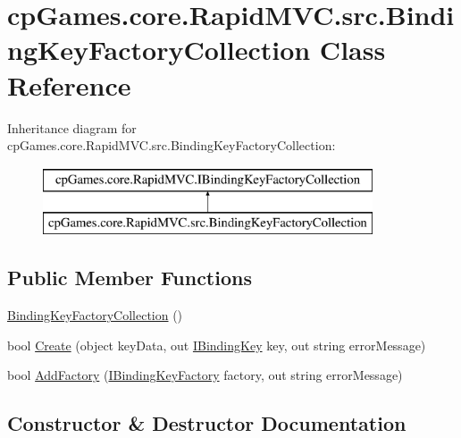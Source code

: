 \hypertarget{classcp_games_1_1core_1_1_rapid_m_v_c_1_1src_1_1_binding_key_factory_collection}{}\section{cp\+Games.\+core.\+Rapid\+M\+V\+C.\+src.\+Binding\+Key\+Factory\+Collection Class Reference}
\label{classcp_games_1_1core_1_1_rapid_m_v_c_1_1src_1_1_binding_key_factory_collection}
Inheritance diagram for cp\+Games.\+core.\+Rapid\+M\+V\+C.\+src.\+Binding\+Key\+Factory\+Collection\+:\begin{figure}[H]
\begin{center}
\leavevmode
\includegraphics[height=2.000000cm]{classcp_games_1_1core_1_1_rapid_m_v_c_1_1src_1_1_binding_key_factory_collection}
\end{center}
\end{figure}
\subsection*{Public Member Functions}
\begin{DoxyCompactItemize}
\item 
\mbox{\hyperlink{classcp_games_1_1core_1_1_rapid_m_v_c_1_1src_1_1_binding_key_factory_collection_a12a47c905f55e786e8fea8a1a24e3273}{Binding\+Key\+Factory\+Collection}} ()
\item 
bool \mbox{\hyperlink{classcp_games_1_1core_1_1_rapid_m_v_c_1_1src_1_1_binding_key_factory_collection_a75cdf372ae3c4f07c7b1caa86ed67425}{Create}} (object key\+Data, out \mbox{\hyperlink{interfacecp_games_1_1core_1_1_rapid_m_v_c_1_1_i_binding_key}{I\+Binding\+Key}} key, out string error\+Message)
\item 
bool \mbox{\hyperlink{classcp_games_1_1core_1_1_rapid_m_v_c_1_1src_1_1_binding_key_factory_collection_a27315eae9bada77b6da3eac11afb3f02}{Add\+Factory}} (\mbox{\hyperlink{interfacecp_games_1_1core_1_1_rapid_m_v_c_1_1_i_binding_key_factory}{I\+Binding\+Key\+Factory}} factory, out string error\+Message)
\end{DoxyCompactItemize}


\subsection{Constructor \& Destructor Documentation}
\mbox{\label{classcp_games_1_1core_1_1_rapid_m_v_c_1_1src_1_1_binding_key_factory_collection_a12a47c905f55e786e8fea8a1a24e3273}} 
